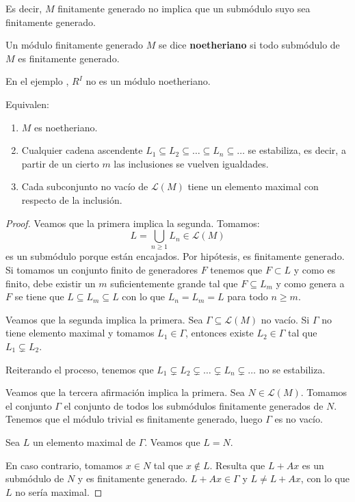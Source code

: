 Es decir, \(M\) finitamente generado no implica que un submódulo suyo
sea finitamente generado.

\begin{df}
  Un módulo finitamente generado \(M\) se dice \textbf{noetheriano} si todo
  submódulo de \(M\) es finitamente generado.
\end{df}

En el ejemplo \label{ejemplo:no_noe}, \(R^I\) no es un módulo noetheriano.

\begin{prop}
  Equivalen:
  \begin{enumerate}
    \item \(M\) es noetheriano.
    \item Cualquier cadena ascendente \(L_1\subseteq L_2\subseteq\ldots
      \subseteq L_n\subseteq\ldots\) se estabiliza, es decir,
      a partir de un cierto \(m\) las inclusiones se vuelven igualdades.
    \item Cada subconjunto no vacío de \(\mathcal{L}(M)\) tiene un elemento
      maximal con respecto de la inclusión.
  \end{enumerate}
\end{prop}

\begin{proof}
  Veamos que la primera implica la segunda.
  Tomamos:
  \[
    L=\bigcup_{n\ge 1} L_n\in\mathcal{L}(M)
  \]
  es un submódulo porque están encajados. Por hipótesis, es finitamente
  generado. Si tomamos un conjunto finito de generadores \(F\)
  tenemos que \(F\subset L\) y como es finito, debe existir un \(m\)
  suficientemente grande tal que \(F\subseteq L_m\) y como
  genera a \(F\) se tiene que \(L\subseteq L_m\subseteq L\)
  con lo que \(L_n=L_m=L\) para todo \(n\ge m\).

  Veamos que la segunda implica la primera. Sea \(\Gamma\subseteq
  \mathcal{L}(M)\) no vacío. Si \(\Gamma\) no tiene elemento maximal
  y tomamos \(L_1\in\Gamma\), entonces existe \(L_2\in\Gamma\)
  tal que \(L_1\subsetneq L_2\).

  Reiterando el proceso, tenemos que \(L_1\subsetneq L_2\subsetneq
  \ldots\subsetneq L_n\subsetneq\ldots\) no se estabiliza.

  Veamos que la tercera afirmación implica la primera.
  Sea \(N\in\mathcal{L}(M)\).
  Tomamos el conjunto \(\Gamma\) el conjunto de todos los submódulos
  finitamente generados de \(N\). Tenemos que el módulo trivial
  es finitamente generado, luego \(\Gamma\) es no vacío.

  Sea \(L\) un elemento maximal de \(\Gamma\). Veamos que \(L=N\).

  En caso contrario, tomamos \(x\in N\) tal que \(x\notin L\). Resulta que
  \(L+Ax\) es un submódulo de \(N\) y es finitamente generado.
  \(L+Ax\in\Gamma\) y \(L\neq L+Ax\), con lo que \(L\) no sería maximal.
\end{proof}

